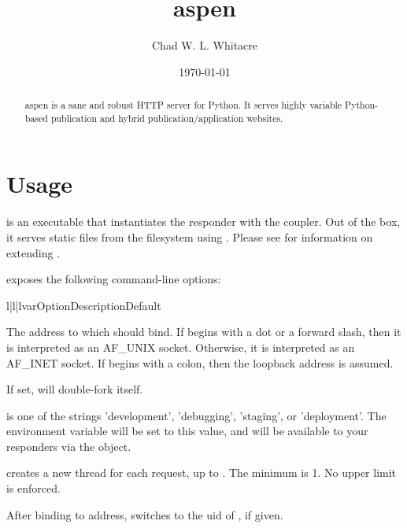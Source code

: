 \documentclass{manual}
\title{aspen}
\author{Chad W. L. Whitacre}
\date\today
\begin{document}
\maketitle

\begin{abstract}

\noindent
aspen is a sane and robust HTTP server for Python. It serves highly variable
Python-based publication and hybrid publication/application websites.

\end{abstract}

\section{Usage}

 is an executable that instantiates the 
responder with the  coupler. Out of the box, it serves static
files from the filesystem using . Please see  for information on extending .

 exposes the following command-line options:


\begin{tableiii}{l|l|l}{var}{Option}{Description}{Default}

    {The address to which  should bind. If  begins
    with a dot or a forward slash, then it is interpreted as an AF_UNIX socket.
    Otherwise, it is interpreted as an AF_INET socket. If  begins
    with a colon, then the loopback address is assumed.} {}

    {If set,  will double-fork itself.}
    {}

    { is one of the strings 'development', 'debugging', 'staging', or
    'deployment'.  The  environment variable will be set to
    this value, and will be available to your responders via the
     object.} {}

    { creates a new thread for each request, up to .
    The minimum is 1. No upper limit is enforced.}
    {}

    {After binding to address,  switches to the uid of
    , if given.}
    {}

\end{tableiii}
\end{document}
